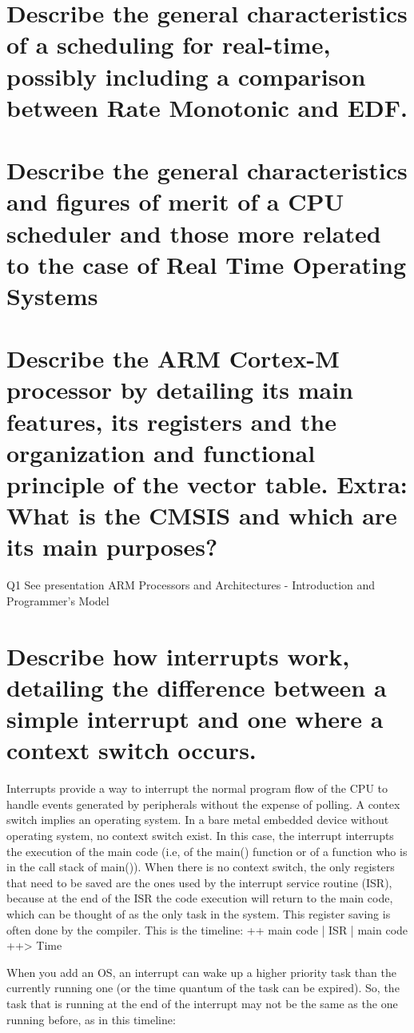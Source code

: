 \section{Describe the general characteristics of a scheduling for real-time, possibly including a comparison between Rate Monotonic and EDF. }



\section{Describe the general characteristics and figures of merit of a CPU scheduler and those more related to the case of Real Time Operating Systems}

\section{Describe the ARM Cortex-M processor by detailing its main features, its registers and the organization and functional principle of the vector table. Extra: What is the CMSIS and which are its main purposes?  }

Q1 See presentation ARM Processors and Architectures - Introduction and Programmer's Model
\section{Describe how interrupts work, detailing the difference between a simple interrupt and one where a context switch occurs.}
Interrupts provide a way to interrupt the normal program flow of the CPU  to handle events generated by peripherals without the expense of polling. A contex switch implies an operating system. In a bare metal embedded device without operating system, no context switch exist. In this case, the interrupt interrupts the execution of the main code (i.e, of the main() function or of a function who is in the call stack of main()). When there is no context switch, the only registers that need to be saved are the ones used by the interrupt service routine (ISR), because at the end of the ISR the code execution will return to the main code, which can be thought of as the only task in the system. This register saving is often done by the compiler. 
This is the timeline:  
++ main code | ISR | main code ++> Time

When you add an OS, an interrupt can wake up a higher priority task than the currently running one (or the time quantum of the task can be expired). So, the task that is running at the end of the interrupt may not be the same as the one running before, as in this timeline: 


